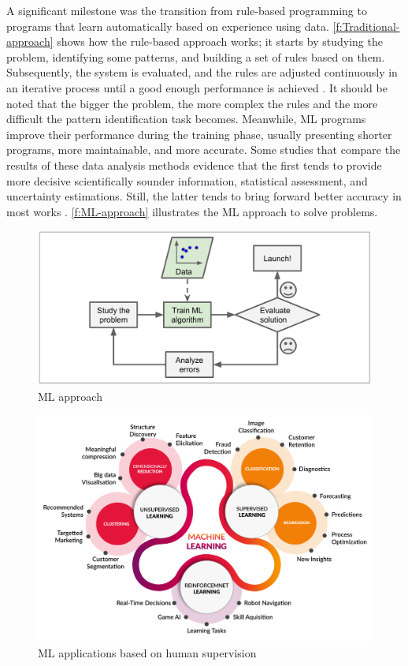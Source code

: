 A significant milestone was the transition from rule-based programming to programs that learn automatically based on experience using data. \autoref{f:Traditional-approach} shows how the rule-based approach works; it starts by studying the problem, identifying some patterns, and building a set of rules based on them. Subsequently, the system is evaluated, and the rules are adjusted continuously in an iterative process until a good enough performance is achieved \cite{geron2017}. It should be noted that the bigger the problem, the more complex the rules and the more difficult the pattern identification task becomes. Meanwhile, \ac{ML} programs improve their performance during the training phase, usually presenting shorter programs, more maintainable, and more accurate. Some studies that compare the results of these data analysis methods evidence that the first tends to provide more decisive scientifically sounder information, statistical assessment, and uncertainty estimations. Still, the latter tends to bring forward better accuracy in most works \cite{geron2017,Ye2020}. \autoref{f:ML-approach} illustrates the \ac{ML} approach to solve problems.


\begin{figure}[t]
\centering
\includegraphics[width=14cm]{figures/Ch2/Ml-Approach.png}
\caption{ML approach \cite{geron2017}}
\label{f:ML-approach}
\end{figure}

\begin{figure}[h]
\centering
\includegraphics[width=\linewidth]{figures/Ch2/ML-Applications-by-type.png}
\caption{ML applications based on human supervision}
\label{f:ML-App-by-type}
\end{figure}

